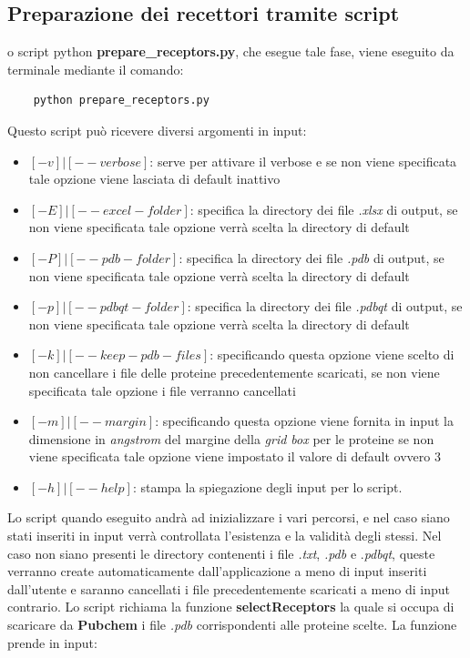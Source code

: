 \subsection{Preparazione dei recettori tramite script} \label{Preparazione dei recettori script}
o script python \textbf{prepare\_receptors.py}, che esegue tale fase, viene eseguito da terminale mediante il comando:

\begin{verbatim}
    python prepare_receptors.py
\end{verbatim}

Questo script può ricevere diversi argomenti in input:

\begin{itemize}
    \item $[-v] | [--verbose]$: serve per attivare il verbose e se non viene specificata tale opzione viene lasciata di default inattivo
    \item $[-E] | [--excel-folder]$: specifica la directory dei file \textit{.xlsx} di output, se non viene specificata tale opzione verrà scelta la directory di default
    \item $[-P] | [--pdb-folder]$: specifica la directory dei file \textit{.pdb} di output, se non viene specificata tale opzione verrà scelta la directory di default
    \item $[-p] | [--pdbqt-folder]$: specifica la directory dei file \textit{.pdbqt} di output, se non viene specificata tale opzione verrà scelta la directory di default
    \item $[-k] | [--keep-pdb-files]$: specificando questa opzione viene scelto di non cancellare i file delle proteine precedentemente scaricati, se non viene specificata tale opzione i file verranno cancellati
    \item $[-m] | [--margin]$: specificando questa opzione viene fornita in input la dimensione in \textit{angstrom} del margine della \textit{grid box} per le proteine se non viene specificata tale opzione viene impostato il valore di default ovvero 3
    \item $[-h] | [--help]$: stampa la spiegazione degli input per lo script.
\end{itemize}

Lo script quando eseguito andrà ad inizializzare i vari percorsi, e nel caso siano stati inseriti in input verrà controllata l'esistenza e la validità degli stessi. Nel caso non siano presenti le directory contenenti i file \textit{.txt}, \textit{.pdb} e .\textit{pdbqt}, queste verranno create automaticamente dall'applicazione a meno di input inseriti dall'utente e saranno cancellati i file precedentemente scaricati a meno di input contrario.\newline
Lo script richiama la funzione \textbf{selectReceptors} la quale si occupa di scaricare da \textbf{Pubchem} i file \textit{.pdb} corrispondenti alle proteine scelte. La funzione prende in input: 

